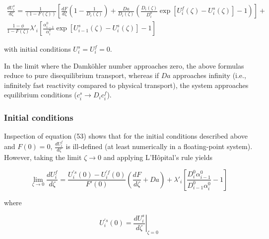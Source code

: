 \documentclass[draft]{agujournal2019}
\begin{document}
\begin{linenomath*}
\begin{equation}\label{eq:54}
    \begin{aligned}
    	\frac{dU_i^s}{d\zeta} = \frac{1}{(1 - F(\zeta))}\left[\frac{dF}{d\zeta} \left(1 - \frac{1}{D_i(\zeta)}\right)+ \frac{Da}{D_i(\zeta)}\left(\frac{D_i(\zeta)}{D_i^0}\exp[U_i^f(\zeta) - U_i^s(\zeta)] - 1\right) \right]+ \\
	\frac{1-\phi}{1-F(\zeta)}\lambda'_i \left[\frac{\alpha_{i-1}^0}{\alpha_i^0} \exp[U_{i-1}^s(\zeta) - U_i^s(\zeta)]-1\right]
    \end{aligned}
\end{equation}
\end{linenomath*}

with initial conditions $U_i^s = U_i^f = 0$.

In the limit where the Damk\"{o}hler number approaches zero, the above formulas reduce to pure disequilibrium transport, whereas if $Da$ approaches infinity (i.e., infinitely fast reactivity compared to physical transport), the system approaches equilibrium conditions ($c_i^s \rightarrow D_i c_i^f$).


\subsubsection{Initial conditions}

Inspection of equation (53) shows that for the initial conditions described above and $F(0)=0$, $\frac{dU_i^f}{d\zeta}$ is ill-defined (at least numerically in a floating-point system). However, taking the limit $\zeta \rightarrow 0$ and applying L'H\^{o}pital's rule yields

\begin{linenomath*}
\begin{equation}
    \lim_{\zeta \rightarrow 0} \frac{dU_i^f}{d\zeta} = \frac{U_i^{'s}(0) - U_i^{'f}(0)}{F'(0)}\left(\frac{dF}{d\zeta} + Da\right) +  \lambda'_i \left[\frac{D_i^0 \alpha_{i-1}^0}{D_{i-1}^0 \alpha_i^0} - 1\right] \label{eq:55}
\end{equation}
\end{linenomath*}

where

\begin{linenomath*}
\begin{equation}
    U_i^{'s}(0) = \left.\frac{dU_i^s}{d\zeta}\right|_{\zeta=0}\label{eq:56}
\end{equation}
\end{linenomath*}
\end{document}
